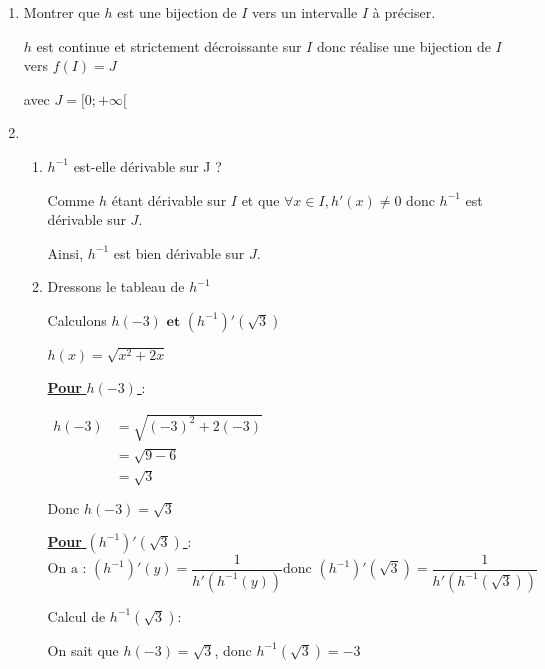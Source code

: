 \documentclass[12pt,a4paper]{article}
\begin{document}
\begin{enumerate}
    \item Montrer que \( h \) est une bijection de \( I \) vers un intervalle \( I \) à préciser.

    \( h \) est continue et strictement décroissante sur \( I \) donc réalise une bijection de \( I \) vers \( f(I) = J \)

    avec \( J = [ 0; +\infty [ \)
    \item 
    \begin{enumerate}
        \item \( h^{-1} \) est-elle dérivable sur J ?
    
    Comme \( h \) étant dérivable sur \( I \) et que  \( \forall x\in I, h'(x) \neq 0 \) donc \( h^{-1} \) est dérivable sur \( J \).

    Ainsi, \( h^{-1} \) est bien dérivable sur \( J \).
    \item Dressons le tableau de \( h^{-1} \)

    \begin{center}
    \end{center}
    Calculons \( h(-3) \textbf{ et } (h^{-1})'( \sqrt{3} )  \)

    \( h(x) = \sqrt{x^{2}+2x} \)

    \underline{\textbf{Pour}  \( h(-3)  \) } : 

\(
    \begin{aligned}
        h(-3) &= \sqrt{(-3)^{2}+2(-3)}\\
              &= \sqrt{9 - 6}\\
              &= \sqrt{3}
    \end{aligned}
\)

\( \text{Donc } \boxed{ h(-3)=\sqrt{3} } \)

    \underline{\textbf{Pour} \( (h^{-1})'( \sqrt{3} )  \) }:
\[\text{On a : }  (h^{-1})'(y) = \frac{1}{h'(h^{-1}(y))} \text{donc } (h^{-1})'(\sqrt{3}) = \frac{1}{h'(h^{-1}(\sqrt{3}))}\]

Calcul de \( h^{-1}(\sqrt{3}) \):

On sait que \( h(-3) = \sqrt{3} \), donc \( h^{-1}(\sqrt{3}) = -3\)


\end{enumerate}
\end{enumerate}
\end{document}
